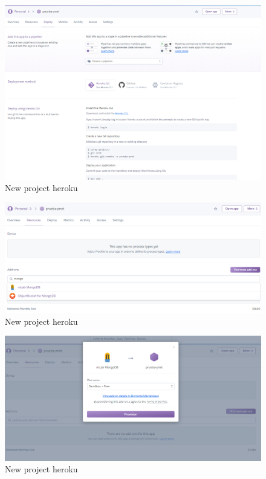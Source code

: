 \documentclass{article}
\begin{document}
\begin{figure}[H]
\centering
\includegraphics[width=\textwidth]{heroku/new_project3}
\caption{New project heroku}
\label{fig:universe}
\end{figure}

\begin{figure}[H]
\centering
\includegraphics[width=\textwidth]{heroku/new_project4}
\caption{New project heroku}
\label{fig:universe}
\end{figure}

\begin{figure}[H]
\centering
\includegraphics[width=\textwidth]{heroku/new_project5}
\caption{New project heroku}
\label{fig:universe}
\end{figure}
\end{document}
